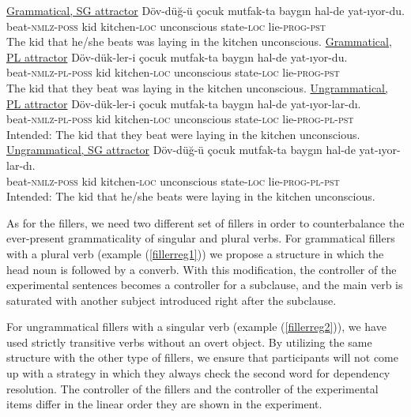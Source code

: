 \documentclass[doc]{apa6}
\begin{document}
\begin{exe}
\ex
  \begin{xlist}
  \ex \underline{Grammatical, SG attractor} \label{reg1}
      \gll D\"{o}v-d\"{u}\u{g}-\"{u} \c{c}ocuk mutfak-ta bayg{\i}n hal-de yat-{\i}yor-du.\\
  beat-\textsc{nmlz}-\textsc{poss} kid kitchen-\textsc{loc} unconscious state-\textsc{loc} lie-\textsc{prog}-\textsc{pst}\\ 
      \glt The kid that he/she beats was laying in the kitchen unconscious.
  \ex \underline{Grammatical, PL attractor} \label{reg2}
      \gll D\"{o}v-d\"{u}k-ler-i \c{c}ocuk mutfak-ta bayg{\i}n hal-de yat-{\i}yor-du.\\
  beat-\textsc{nmlz}-\textsc{pl}-\textsc{poss} kid kitchen-\textsc{loc} unconscious state-\textsc{loc} lie-\textsc{prog}-\textsc{pst}\\
      \glt The kid that they beat was laying in the kitchen unconscious.
  \ex \underline{Ungrammatical, PL attractor} \label{reg3}
      \gll D\"{o}v-d\"{u}k-ler-i \c{c}ocuk mutfak-ta bayg{\i}n hal-de yat-{\i}yor-lar-d{\i}.\\
  beat-\textsc{nmlz}-\textsc{pl}-\textsc{poss} kid kitchen-\textsc{loc} unconscious state-\textsc{loc} lie-\textsc{prog}-\textsc{pl}-\textsc{pst}\\
      \glt Intended: The kid that they beat were laying in the kitchen unconscious.
  \ex \underline{Ungrammatical, SG attractor} \label{reg4}
      \gll D\"{o}v-d\"{u}\u{g}-\"{u} \c{c}ocuk mutfak-ta bayg{\i}n hal-de yat-{\i}yor-lar-d{\i}.\\
  beat-\textsc{nmlz}-\textsc{poss} kid kitchen-\textsc{loc} unconscious state-\textsc{loc} lie-\textsc{prog}-\textsc{pl}-\textsc{pst}\\
      \glt Intended: The kid that he/she beats were laying in the kitchen unconscious.
  \end{xlist}
\end{exe}

As for the fillers, we need two different set of fillers in order to
counterbalance the ever-present grammaticality of singular and plural
verbs. For grammatical fillers with a plural verb (example
(\ref{fillerreg1})) we propose a structure in which the head noun is
followed by a converb. With this modification, the controller of the
experimental sentences becomes a controller for a subclause, and the
main verb is saturated with another subject introduced right after the
subclause.

For ungrammatical fillers with a singular verb (example
(\ref{fillerreg2})), we have used strictly transitive verbs without an
overt object. By utilizing the same structure with the other type of
fillers, we ensure that participants will not come up with a strategy in
which they always check the second word for dependency resolution. The
controller of the fillers and the controller of the experimental items
differ in the linear order they are shown in the experiment.
\end{document}
